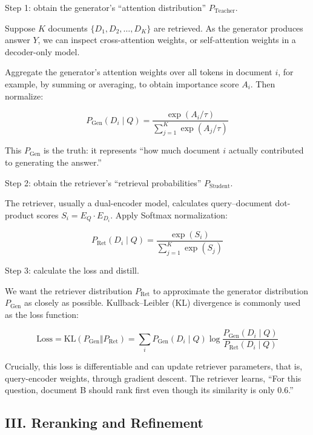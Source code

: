 Step 1: obtain the generator's ``attention distribution'' \(P_{\mathrm{Teacher}}\).

Suppose \(K\) documents \(\{D_1,D_2,\ldots,D_K\}\) are retrieved. As the generator produces answer \(Y\), we can inspect cross-attention weights, or self-attention weights in a decoder-only model.

Aggregate the generator's attention weights over all tokens in document \(i\), for example, by summing or averaging, to obtain importance score \(A_i\). Then normalize:

\[
P_{\mathrm{Gen}}(D_i\mid Q)=\frac{\exp(A_i/\tau)}{\sum_{j=1}^{K}\exp(A_j/\tau)}
\]

This \(P_{\mathrm{Gen}}\) is the truth: it represents ``how much document \(i\) actually contributed to generating the answer.''

Step 2: obtain the retriever's ``retrieval probabilities'' \(P_{\mathrm{Student}}\).

The retriever, usually a dual-encoder model, calculates query--document dot-product scores \(S_i=E_Q\cdot E_{D_i}\). Apply Softmax normalization:

\[
P_{\mathrm{Ret}}(D_i\mid Q)=\frac{\exp(S_i)}{\sum_{j=1}^{K}\exp(S_j)}
\]

Step 3: calculate the loss and distill.

We want the retriever distribution \(P_{\mathrm{Ret}}\) to approximate the generator distribution \(P_{\mathrm{Gen}}\) as closely as possible. Kullback--Leibler (KL) divergence is commonly used as the loss function:

\[
\mathrm{Loss}=\mathrm{KL}(P_{\mathrm{Gen}}\Vert P_{\mathrm{Ret}})=\sum_i P_{\mathrm{Gen}}(D_i\mid Q)\log\frac{P_{\mathrm{Gen}}(D_i\mid Q)}{P_{\mathrm{Ret}}(D_i\mid Q)}
\]

Crucially, this loss is differentiable and can update retriever parameters, that is, query-encoder weights, through gradient descent. The retriever learns, ``For this question, document B should rank first even though its similarity is only \(0.6\).''

\hypertarget{iii.-reranking-and-refinement}{%
\subsection{III. Reranking and Refinement}\label{iii.-reranking-and-refinement}}


